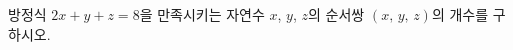 \hspace*{2mm}\begin{minipage}[t]{\dimexpr\linewidth-2mm\relax}\vspace{0pt}
방정식 $2x+y+z=8$을 만족시키는 자연수 $x$, $y$, $z$의 순서쌍 $(x,\,y,\,z)$의 개수를 구하시오.\end{minipage}
